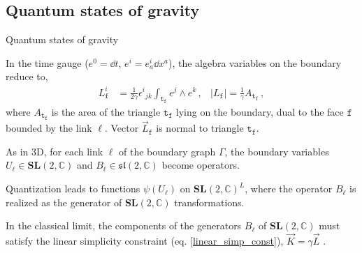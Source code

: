 \documentclass[12pt,titlepage]{article}
\begin{document}
\subsection{Quantum states of gravity}

\begin{frame}{Quantum states of gravity}
    \begin{list}{\,}{\leftmargin=1em \itemindent=0em}
        \item<1-> In the time gauge ($e^0=\dd{t}$, $e^i=e^i_a\dd{x^a}$), the algebra variables on the boundary reduce to,
        \begin{align}
            L^i_\mathtt{f}&=\frac{1}{2\gamma}{\epsilon^{i}}_{jk}\int_{\mathtt{t_\mathtt{f}}}e^j\wedge e^k\,, & \lvert L_\mathtt{f} \rvert =\frac{1}{\gamma} A_{\mathtt{t_\mathtt{f}}}\,,
        \end{align}
        where $A_{\mathtt{t_\mathtt{f}}}$ is the area of the triangle $\mathtt{t_\mathtt{f}}$ lying on the boundary, dual to the face $\mathtt{f}$ bounded by the link $\ell$. Vector $\vec{L}_\mathtt{f}$ is normal to triangle $\mathtt{t_\mathtt{f}}$.
        \item<2-> As in 3D, for each link $\ell$ of the boundary graph $\Gamma$, the boundary variables $U_\ell\in\mathbf{SL}(2,\mathbb{C})$ and $B_\ell\in\mathfrak{sl}(2,\mathbb{C})$ become operators.
        \item<3-> Quantization leads to functions $\psi(U_\ell)$ on ${\mathbf{SL}(2,\mathbb{C})}^L$, where the operator $B_\ell$ is realized as the generator of $\mathbf{SL}(2,\mathbb{C})$ transformations.
        \item<4-> In the classical limit, the components of the generators $B_\ell$ of $\mathbf{SL}(2,\mathbb{C})$ must satisfy the linear simplicity constraint (eq. \ref{linear_simp_const}), $\vec{K}=\gamma\vec{L}$ .
    \end{list}
\end{frame}
\end{document}
